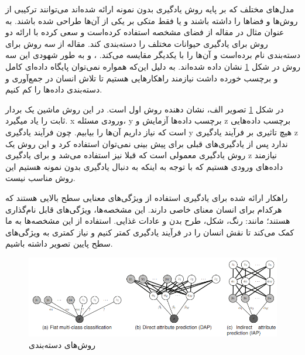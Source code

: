 مدل‌های مختلف که بر پایه روش یادگیری بدون نمونه ارائه شده‌اند می‌توانند ترکیبی از روش‌ها و فضا‌ها را داشته باشند و یا فقط متکی بر یکی از آن‌ها طراحی شده باشند. به عنوان مثال در مقاله 
\cite{Lampert2014}
از فضای مشخصه استفاده کرده‌است و سعی کرده با ارائه دو روش برای یادگیری حیوانات مختلف را دسته‌بندی کند. مقاله از سه روش برای دسته‌بندی نام برده‌است و آن‌ها را با یکدیگر مقایسه می‌کند.	
،
 و 
به طور شهودی این سه روش در شکل 
\ref{fig:learning-methods}
نشان داده شده‌اند.
به دلیل این‌که همواره نمی‌توان پایگاه داده‌ای کامل و برچسب خورده داشت نیازمند راهکار‌هایی هستیم تا تلاش انسان در جمع‌آوری و دسته‌بندی‌ داده‌ها را کم کنیم.

در شکل
\ref{fig:learning-methods}
تصویر الف، نشان دهنده روش اول است. در این روش ماشین یک بردار ثابت را یاد میگیرد. x ورودی مسئله، y برچسب‌ داده‌ها آزمایش و z برچسب داده‌هایی است که نیاز داریم آن‌ها را بیابیم. چون فرآيند یادگیری y هیچ تاثیری بر فرآیند یادگیری z ندارد پس از یادگیری‌های قبلی برای پیش بینی نمی‌توان استفاده کرد و این روش یک روش یادگیری معمولی است که قبلا نیز استفاده می‌شد و برای یادگیری z نیازمند داده‌های ورودی هستیم که با توجه به اینکه به دنبال یادگیری بدون نمونه هستیم این روش مناسب نیست.

راهکار ارائه شده برای یادگیری استفاده از ویژگی‌های معنایی سطح بالایی هستند که هرکدام برای انسان معنای خاصی دارند. این مشخصه‌ها، ویژگی‌های قابل نام‌گذاری هستند؛ مانند: رنگ، شکل، طرح بدن و عادات غذایی. استفاده از این مشخصه‌‌ها به ما کمک می‌کند تا نقش انسان را در فرآیند یادگیری کمتر کنیم و نیاز کمتری به ویژگی‌های سطح پایین تصویر داشته باشیم.

\begin{figure}[b]
	
	\centering
	\includegraphics[width=\textwidth]{img/report/learning-methods}
	\caption{روش‌های دسته‌بندی \cite{Lampert2014}}
	\label{fig:learning-methods}
	\centering
\end{figure}

